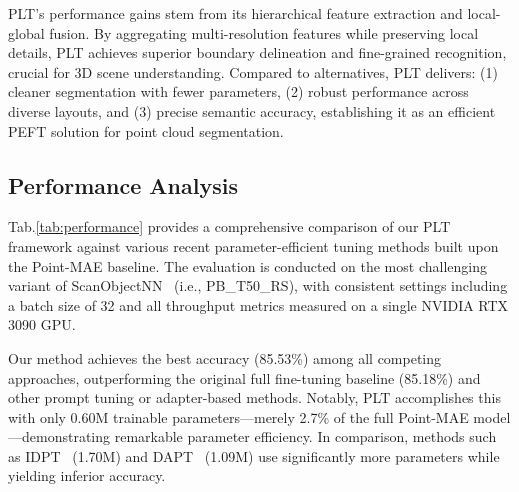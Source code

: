 PLT's performance gains stem from its hierarchical feature extraction and local-global fusion. By aggregating multi-resolution features while preserving local details, PLT achieves superior boundary delineation and fine-grained recognition, crucial for 3D scene understanding. Compared to alternatives, PLT delivers: (1) cleaner segmentation with fewer parameters, (2) robust performance across diverse layouts, and (3) precise semantic accuracy, establishing it as an efficient PEFT solution for point cloud segmentation.





\subsection{Performance Analysis}

Tab.\ref{tab:performance} provides a comprehensive comparison of our PLT framework against various recent parameter-efficient tuning methods built upon the Point-MAE\cite{pang2022masked} baseline. The evaluation is conducted on the most challenging variant of ScanObjectNN~\cite{uy2019revisiting} (i.e., PB\_T50\_RS), with consistent settings including a batch size of 32 and all throughput metrics measured on a single NVIDIA RTX 3090 GPU.

Our method achieves the best accuracy (85.53\%) among all competing approaches, outperforming the original full fine-tuning baseline (85.18\%) and other prompt tuning or adapter-based methods. Notably, PLT accomplishes this with only 0.60M trainable parameters—merely 2.7\% of the full Point-MAE model—demonstrating remarkable parameter efficiency. In comparison, methods such as IDPT~\cite{zha2023instance} (1.70M) and DAPT~\cite{zhou2024dynamic} (1.09M) use significantly more parameters while yielding inferior accuracy.

